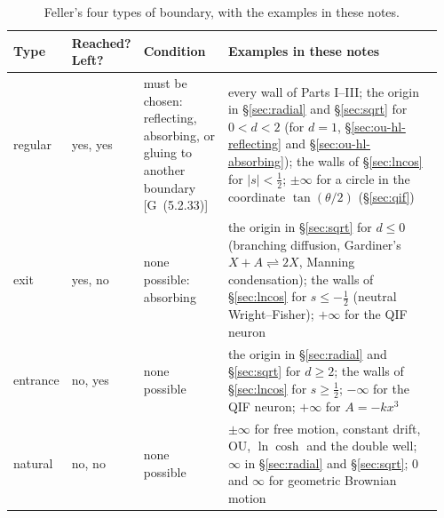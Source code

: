 \documentclass[11pt]{article}
\numberwithin{equation}{section}
\newcommand{\G}[1]{[G~(#1)]}
\begin{document}
\begin{table}[h]
\centering
\footnotesize
\renewcommand{\arraystretch}{1.3}
\setlength{\tabcolsep}{3pt}
\begin{tabular}{@{}>{\raggedright}p{0.1\linewidth} >{\raggedright}p{0.11\linewidth} >{\raggedright}p{0.2\linewidth} >{\raggedright\arraybackslash}p{0.55\linewidth}@{}}
\toprule
Type & Reached? Left? & Condition & Examples in these notes \\
\midrule
regular & yes, yes & must be chosen: reflecting, absorbing, or gluing to another boundary \G{5.2.33} & every wall of
Parts I--III; the origin in \S\ref{sec:radial} and \S\ref{sec:sqrt} for $0<d<2$ (for $d=1$, \S\ref{sec:ou-hl-reflecting}
and \S\ref{sec:ou-hl-absorbing}); the walls of \S\ref{sec:lncos} for $|s|<\frac12$; $\pm\infty$ for a circle in the
coordinate $\tan(\theta/2)$ (\S\ref{sec:qif}) \\
exit & yes, no & none possible: absorbing & the origin in \S\ref{sec:sqrt} for $d\le0$ (branching diffusion, Gardiner's
$X+A\rightleftharpoons2X$, Manning condensation); the walls of \S\ref{sec:lncos} for $s\le-\frac12$ (neutral
Wright--Fisher); $+\infty$ for the QIF neuron \\
entrance & no, yes & none possible & the origin in \S\ref{sec:radial} and \S\ref{sec:sqrt} for $d\ge2$; the walls of
\S\ref{sec:lncos} for $s\ge\frac12$; $-\infty$ for the QIF neuron; $+\infty$ for $A=-kx^3$ \\
natural & no, no & none possible & $\pm\infty$ for free motion, constant drift, OU, $\ln\cosh$ and the double well;
$\infty$ in \S\ref{sec:radial} and \S\ref{sec:sqrt}; $0$ and $\infty$ for geometric Brownian motion \\
\bottomrule
\end{tabular}
\caption{Feller's four types of boundary, with the examples in these notes.}
\label{tab:feller}
\end{table}
\end{document}
